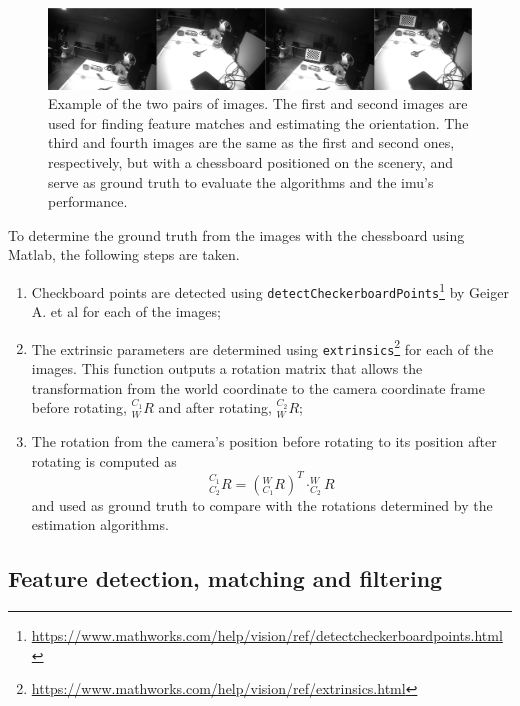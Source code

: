 \begin{figure}[ht]
	\centering
	\includegraphics[width=\textwidth]{images/imagesex.png}
	\caption[Example of the two pairs of images]{Example of the two pairs of images. The first and second images are used for finding feature matches and estimating the orientation. The third and fourth images are the same as the first and second ones, respectively, but with a chessboard positioned on the scenery, and serve as ground truth to evaluate the algorithms and the \acrshort{imu}'s performance.}
	\label{cha3:methodology:imagesex}
\end{figure}

To determine the ground truth from the images with the chessboard using Matlab, the following steps are taken.

\begin{enumerate}
	\item Checkboard points are detected using \texttt{detectCheckerboardPoints}\footnote{\href{https://www.mathworks.com/help/vision/ref/detectcheckerboardpoints.html}{https://www.mathworks.com/help/vision/ref/detectcheckerboardpoints.html}} by Geiger A. et al \cite{geiger} for each of the images;
	\item The extrinsic parameters are determined using \texttt{extrinsics}\footnote{\href{https://www.mathworks.com/help/vision/ref/extrinsics.html}{https://www.mathworks.com/help/vision/ref/extrinsics.html}} for each of the images. This function outputs a rotation matrix that allows the transformation from the world coordinate to the camera coordinate frame before rotating, $^{C_1}_{W}R$ and after rotating, $^{C_2}_{W}R$;
	\item The rotation from the camera's position before rotating to its position after rotating is computed as
	\begin{equation}
		^{C_1}_{C_2}R = (^{W}_{C_1}R)^T  \cdot  ^{W}_{C_2}R
	\end{equation}
	and used as ground truth to compare with the rotations determined by the estimation algorithms.
\end{enumerate}

\subsection{Feature detection, matching and filtering}
\label{cha3:features}

